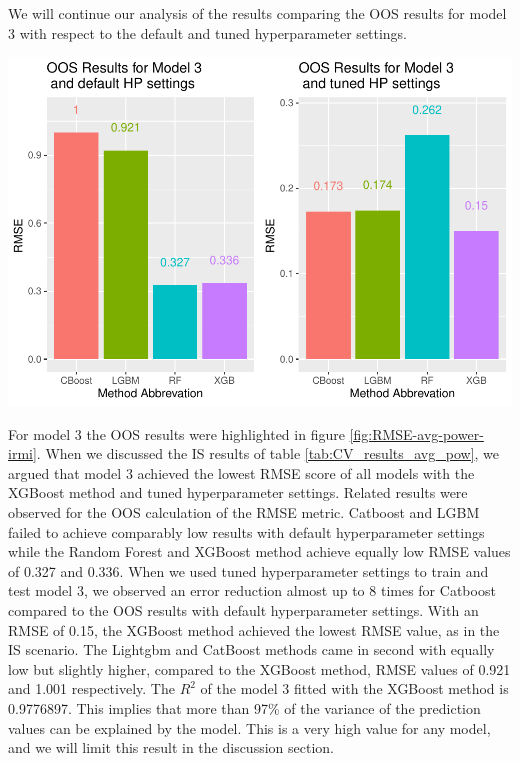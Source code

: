 \documentclass[12pt,a4paper]{article}
\let\origfigure\figure
\let\endorigfigure\endfigure
\renewenvironment{figure}[1][2] {
    \expandafter\origfigure\expandafter[H]
} {
    \endorigfigure
}
\begin{document}
We will continue our analysis of the results comparing the OOS results for model 3 with respect to the default and tuned hyperparameter settings.

\begin{figure}[!H]
\includegraphics{Master_Thesis_files/figure-latex/RMSE-avg-power-irmi-1} \caption{OOS results for model 3}\label{fig:RMSE-avg-power-irmi}
\end{figure}

For model 3 the OOS results were highlighted in figure \ref{fig:RMSE-avg-power-irmi}. When we discussed the IS results of table \ref{tab:CV_results_avg_pow}, we argued that model 3 achieved the lowest RMSE score of all models with the XGBoost method and tuned hyperparameter settings. Related results were observed for the OOS calculation of the RMSE metric. Catboost and LGBM failed to achieve comparably low results with default hyperparameter settings while the Random Forest and XGBoost method achieve equally low RMSE values of 0.327 and 0.336. When we used tuned hyperparameter settings to train and test model 3, we observed an error reduction almost up to 8 times for Catboost compared to the OOS results with default hyperparameter settings. With an RMSE of 0.15, the XGBoost method achieved the lowest RMSE value, as in the IS scenario. The Lightgbm and CatBoost methods came in second with equally low but slightly higher, compared to the XGBoost method, RMSE values of 0.921 and 1.001 respectively. The \(R^2\) of the model 3 fitted with the XGBoost method is 0.9776897. This implies that more than 97\% of the variance of the prediction values can be explained by the model. This is a very high value for any model, and we will limit this result in the discussion section.
\end{document}

